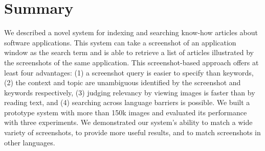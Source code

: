\documentclass{www2010-submission}
\begin{document}
\section{Summary}

We described a novel system for indexing and searching know-how
articles about software applications. This system can take a
screenshot of an application window as the search term and is able to
retrieve a list of articles illustrated by the screenshots of the same
application. This screenshot-based approach offers at least four
advantages: (1) a screenshot query is easier to specify than keywords,
(2) the context and topic are unambiguous identified by the screenshot
and keywords respectively, (3) judging relevancy by viewing images is
faster than by reading text, and (4) searching across language
barriers is possible. We built a prototype system with more than 150k
images and evaluated its performance with three experiments. We
demonstrated our system's ability to match a wide variety of
screenshots, to provide more useful results, and to match screenshots
in other languages.





\balancecolumns %

\end{document}
